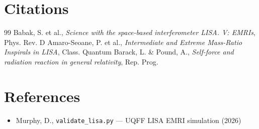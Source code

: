 \documentclass[12pt,a4paper]{article}
\begin{document}
\section*{Citations}
\begin{thebibliography}{99}
 Babak, S. et al., \emph{Science with the space-based interferometer LISA. V: EMRIs}, Phys. Rev. D
 Amaro-Seoane, P. et al., \emph{Intermediate and Extreme Mass-Ratio Inspirals in LISA}, Class. Quantum
 Barack, L. \& Pound, A., \emph{Self-force and radiation reaction in general relativity}, Rep. Prog.
\end{thebibliography}

\section*{References}
\begin{itemize}
  \item[4.] Murphy, D., \texttt{validate\_lisa.py} --- UQFF LISA EMRI simulation (2026)
\end{itemize}

\end{document}
